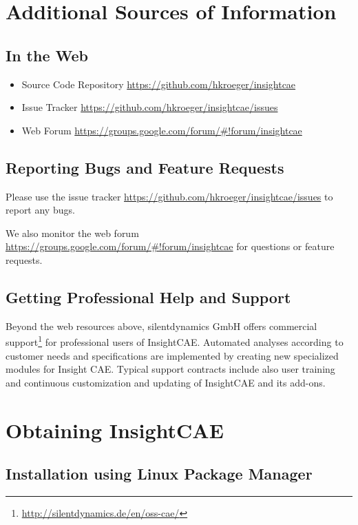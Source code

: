 \section{Additional Sources of Information}

\subsection{In the Web}

\begin{itemize}
\item Source Code Repository \url{https://github.com/hkroeger/insightcae}
\item Issue Tracker \url{https://github.com/hkroeger/insightcae/issues}
\item Web Forum \url{https://groups.google.com/forum/#!forum/insightcae}
\end{itemize}

\subsection{Reporting Bugs and Feature Requests}

Please use the issue tracker \url{https://github.com/hkroeger/insightcae/issues} to report any bugs.

We also monitor the web forum \url{https://groups.google.com/forum/#!forum/insightcae} for questions or feature requests.

\subsection{Getting Professional Help and Support}

Beyond the web resources above, silentdynamics GmbH offers commercial support\footnote{\url{http://silentdynamics.de/en/oss-cae/}} for professional users of InsightCAE. Automated analyses according to customer needs and specifications are implemented  by creating new specialized modules for Insight CAE.
Typical support contracts include also user training and continuous customization and updating of InsightCAE and its add-ons.






\section{Obtaining InsightCAE}

\subsection{Installation using Linux Package Manager}

